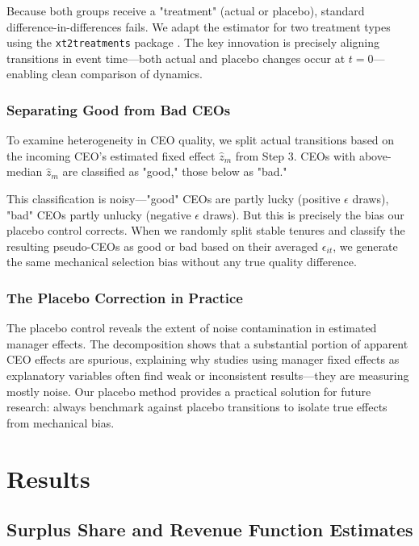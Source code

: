 \documentclass[11pt,a4paper]{article}
\begin{document}
Because both groups receive a "treatment" (actual or placebo), standard difference-in-differences fails. We adapt the \citet{Callaway2021JoLE} estimator for two treatment types using the \texttt{xt2treatments} package \citep{Koren2024xt2treatments}. The key innovation is precisely aligning transitions in event time—both actual and placebo changes occur at $t=0$—enabling clean comparison of dynamics.

\subsubsection{Separating Good from Bad CEOs}

To examine heterogeneity in CEO quality, we split actual transitions based on the incoming CEO's estimated fixed effect $\hat{z}_m$ from Step 3. CEOs with above-median $\hat{z}_m$ are classified as "good," those below as "bad."

This classification is noisy—"good" CEOs are partly lucky (positive $\epsilon$ draws), "bad" CEOs partly unlucky (negative $\epsilon$ draws). But this is precisely the bias our placebo control corrects. When we randomly split stable tenures and classify the resulting pseudo-CEOs as good or bad based on their averaged $\epsilon_{it}$, we generate the same mechanical selection bias without any true quality difference.


\subsubsection{The Placebo Correction in Practice}

The placebo control reveals the extent of noise contamination in estimated manager effects. The decomposition shows that a substantial portion of apparent CEO effects are spurious, explaining why studies using manager fixed effects as explanatory variables often find weak or inconsistent results—they are measuring mostly noise. Our placebo method provides a practical solution for future research: always benchmark against placebo transitions to isolate true effects from mechanical bias.

\section{Results}

\subsection{Surplus Share and Revenue Function Estimates}
\end{document}
